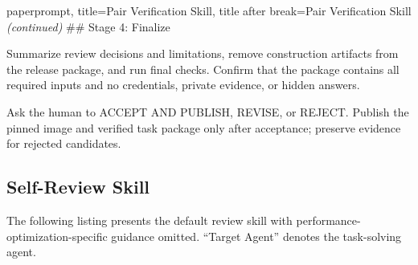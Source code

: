 \begin{tcblisting}{paperprompt,
  title={Pair Verification Skill},
  title after break={Pair Verification Skill \normalfont\itshape (continued)}
}
## Stage 4: Finalize

Summarize review decisions and limitations, remove construction artifacts from the release package, and run final checks. Confirm that the package contains all required inputs and no credentials, private evidence, or hidden answers.

Ask the human to ACCEPT AND PUBLISH, REVISE, or REJECT. Publish the pinned image and verified task package only after acceptance; preserve evidence for rejected candidates.
\end{tcblisting}

\subsection{Self-Review Skill}
\label{app:boxbox-review-skill}


The following listing presents the default review skill with performance-optimization-specific guidance omitted. ``Target Agent'' denotes the task-solving agent.

